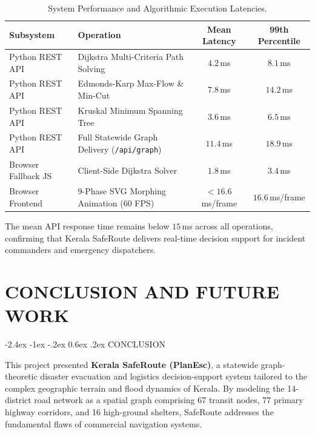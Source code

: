 \documentclass[12pt,oneside]{report}
\makeatletter
\renewcommand{\section}{\@startsection{section}{1}{\z@}%
  {-2.4ex \@plus -1ex \@minus -.2ex}%
  {0.6ex \@plus .2ex}%
  {\normalfont\large\bfseries}}
\newcommand{\chapterpage}[1]{\chapter{#1}}
\makeatother
\begin{document}
\begin{table}[H]
\centering
\small
\caption{System Performance and Algorithmic Execution Latencies.}
\label{tab:benchmarks}
\vspace{0.05in}
\begin{tabularx}{\textwidth}{llcc}
\toprule
\textbf{Subsystem} & \textbf{Operation} & \textbf{Mean Latency} & \textbf{99th Percentile} \\
\midrule
Python REST API & Dijkstra Multi-Criteria Path Solving & $4.2$\,ms & $8.1$\,ms \\
Python REST API & Edmonds-Karp Max-Flow \& Min-Cut & $7.8$\,ms & $14.2$\,ms \\
Python REST API & Kruskal Minimum Spanning Tree & $3.6$\,ms & $6.5$\,ms \\
Python REST API & Full Statewide Graph Delivery (\texttt{/api/graph}) & $11.4$\,ms & $18.9$\,ms \\
Browser Fallback JS & Client-Side Dijkstra Solver & $1.8$\,ms & $3.4$\,ms \\
Browser Frontend & 9-Phase SVG Morphing Animation (60 FPS) & $< 16.6$\,ms/frame & $16.6$\,ms/frame \\
\bottomrule
\end{tabularx}
\end{table}

The mean API response time remains below $15$\,ms across all operations, confirming that Kerala SafeRoute delivers real-time decision support for incident commanders and emergency dispatchers.

\clearpage

\chapterpage{CONCLUSION AND FUTURE WORK}

\section{CONCLUSION}

This project presented \textbf{Kerala SafeRoute (PlanEsc)}, a statewide graph-theoretic disaster evacuation and logistics decision-support system tailored to the complex geographic terrain and flood dynamics of Kerala. By modeling the 14-district road network as a spatial graph comprising 67 transit nodes, 77 primary highway corridors, and 16 high-ground shelters, SafeRoute addresses the fundamental flaws of commercial navigation systems.
\end{document}
